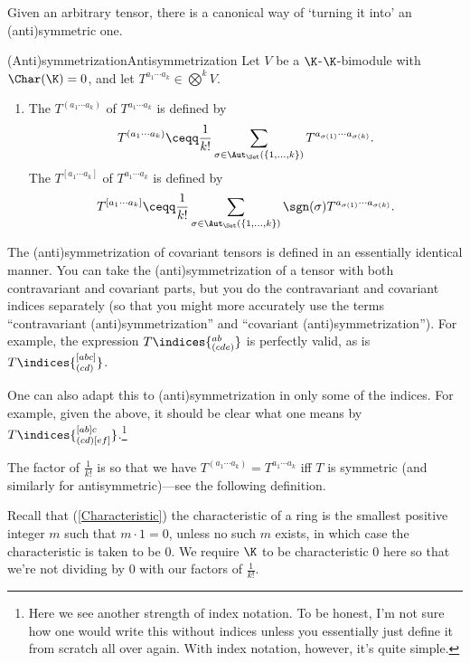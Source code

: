 Given an arbitrary tensor, there is a canonical way of `turning it into' an (anti)symmetric one.
\begin{dfn}{(Anti)symmetrization}{Antisymmetrization}
	Let $V$ be a $\K$-$\K$-bimodule with $\Char (\K )=0$, and let $T^{a_1\cdots a_k}\in \bigotimes ^kV$.
	\begin{enumerate}
		\item The  $T^{(a_1\cdots a_k)}$ of $T^{a_1\cdots a_k}$ is defined by
		\begin{equation*}
			T^{(a_1\cdots a_k)}\ceqq \frac{1}{k!}\sum _{\sigma \in \Aut _{\Set}(\{ 1,\ldots ,k\})}T^{a_{\sigma (1)}\cdots a_{\sigma (k)}}.
		\end{equation*}
		The  $T^{[a_1\cdots a_k]}$ of $T^{a_1\cdots a_k}$ is defined by
		\begin{equation*}
			T^{[a_1\cdots a_k]}\ceqq \frac{1}{k!}\sum _{\sigma \in \Aut _{\Set}(\{ 1,\ldots ,k\})}\sgn (\sigma )T^{a_{\sigma (1)}\cdots a_{\sigma (k)}}.
		\end{equation*}
	\end{enumerate}
	\begin{rmk}
		The (anti)symmetrization of covariant tensors is defined in an essentially identical manner.  You can take the (anti)symmetrization of a tensor with both contravariant and covariant parts, but you do the contravariant and covariant indices separately (so that you might more accurately use the terms ``contravariant (anti)symmetrization'' and ``covariant (anti)symmetrization'').  For example, the expression $T\indices{^{ab}_{(cde)}}$ is perfectly valid, as is $T\indices{^{[abc]}_{(cd)}}$.
	\end{rmk}
	\begin{rmk}
		One can also adapt this to (anti)symmetrization in only some of the indices.  For example, given the above, it should be clear what one means by $T\indices{^{[ab]c}_{(cd)[ef]}}$.\footnote{Here we see another strength of index notation.  To be honest, I'm not sure how one would write this without indices unless you essentially just define it from scratch all over again.  With index notation, however, it's quite simple.}
	\end{rmk}
	\begin{rmk}
		The factor of $\frac{1}{k!}$ is so that we have $T^{(a_1\cdots a_k)}=T^{a_1\cdots a_k}$ iff $T$ is symmetric (and similarly for antisymmetric)---see the following definition.
	\end{rmk}
	\begin{rmk}
		Recall that (\cref{Characteristic}) the characteristic of a ring is the smallest positive integer $m$ such that $m\cdot 1=0$, unless no such $m$ exists, in which case the characteristic is taken to be $0$.  We require $\K$ to be characteristic $0$ here so that we're not dividing by $0$ with our factors of $\frac{1}{k!}$.
	\end{rmk}
\end{dfn}
